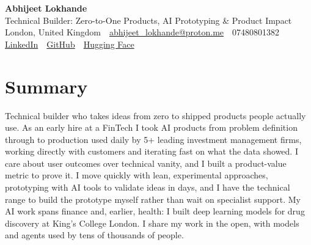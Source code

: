 \documentclass[10pt,a4paper]{article}
\newcommand{\sep}{\,\textcolor{accent!60}{\textbar}\,}
\begin{document}
\begin{center}
  {\fontsize{24}{26}\selectfont\bfseries Abhijeet Lokhande}\\[3pt]
  {\color{accent}\large Technical Builder: Zero-to-One Products, AI Prototyping \& Product Impact}\\[5pt]
  {\small
    London, United Kingdom \sep
    \href{mailto:abhijeet_lokhande@proton.me}{abhijeet\_lokhande@proton.me} \sep
    07480801382 \\[2pt]
    \href{https://www.linkedin.com/in/ablds/}{LinkedIn} \sep
    \href{https://github.com/abhijeetscode}{GitHub} \sep
    \href{https://huggingface.co/ab-ai}{Hugging Face}
  }
\end{center}
\vspace{2pt}

\section{Summary}
Technical builder who takes ideas from zero to shipped products people actually use. As an early hire at a FinTech I took AI products from problem definition through to production used daily by 5+ leading investment management firms, working directly with customers and iterating fast on what the data showed. I care about user outcomes over technical vanity, and I built a product-value metric to prove it. I move quickly with lean, experimental approaches, prototyping with AI tools to validate ideas in days, and I have the technical range to build the prototype myself rather than wait on specialist support. My AI work spans finance and, earlier, health: I built deep learning models for drug discovery at King's College London. I share my work in the open, with models and agents used by tens of thousands of people.

\end{document}
